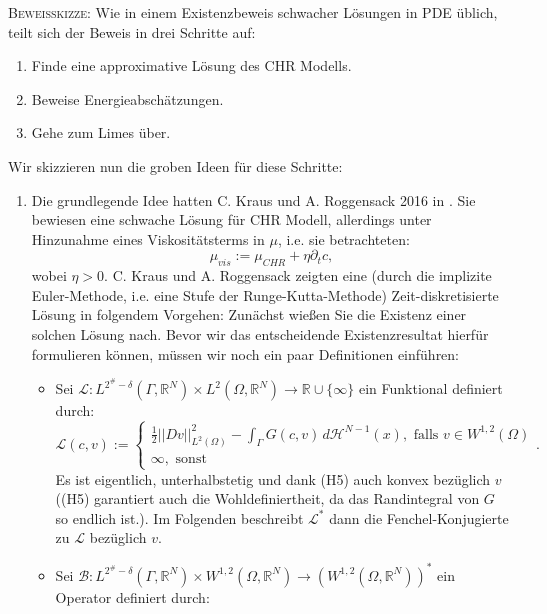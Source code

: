 \textsc{Beweisskizze:} Wie in einem Existenzbeweis schwacher Lösungen in PDE üblich, teilt sich der Beweis in drei Schritte auf:
\begin{enumerate}
    \item Finde eine approximative Lösung des CHR Modells.
    \item Beweise Energieabschätzungen.
    \item Gehe zum Limes über.
\end{enumerate}
Wir skizzieren nun die groben Ideen für diese Schritte:
\begin{enumerate}
    \item Die grundlegende Idee hatten C. Kraus und A. Roggensack 2016 in \cite{kraus2016existence}. Sie bewiesen eine schwache Lösung für CHR Modell, allerdings unter Hinzunahme eines Viskositätsterms in \(\mu\), i.e. sie betrachteten:
    \begin{equation}
        \mu_{vis} := \mu_{CHR} + \eta \partial_t c,
    \end{equation}
    wobei \(\eta > 0\). C. Kraus und A. Roggensack zeigten eine (durch die implizite Euler-Methode, i.e. eine Stufe der Runge-Kutta-Methode) Zeit-diskretisierte Lösung in folgendem Vorgehen: Zunächst wießen Sie die Existenz einer solchen Lösung nach. Bevor wir das entscheidende Existenzresultat hierfür formulieren können, müssen wir noch ein paar Definitionen einführen:
    \begin{itemize}
        \item Sei \(\mathcal{L} : L^{2^\# - \delta}(\Gamma, \mathbb{R}^N) \times L^2(\Omega,\mathbb{R}^N) \to \mathbb{R} \cup \{\infty\}\) ein Funktional definiert durch:
        \begin{equation}
            \mathcal{L}(c,v) := \begin{cases}
                \frac{1}{2} ||Dv||_{L^2(\Omega)}^2 - \int_{\Gamma} G(c,v) \,d\mathcal{H}^{N-1}(x), \text{ falls }v \in W^{1,2}(\Omega) \\
                \infty, \text{ sonst}
            \end{cases}.
        \end{equation}
        Es ist eigentlich, unterhalbstetig und dank (H5) auch konvex bezüglich \(v\) ((H5) garantiert auch die Wohldefiniertheit, da das Randintegral von \(G\) so endlich ist.). Im Folgenden beschreibt \(\mathcal{L}^*\) dann die Fenchel-Konjugierte zu \(\mathcal{L}\) bezüglich \(v\).
        \item Sei \(\mathcal{B} : L^{2^\# - \delta} (\Gamma,\mathbb{R}^N) \times W^{1,2}(\Omega,\mathbb{R}^N) \to (W^{1,2}(\Omega,\mathbb{R}^N))^*\) ein Operator definiert durch:

\end{itemize}
\end{enumerate}
